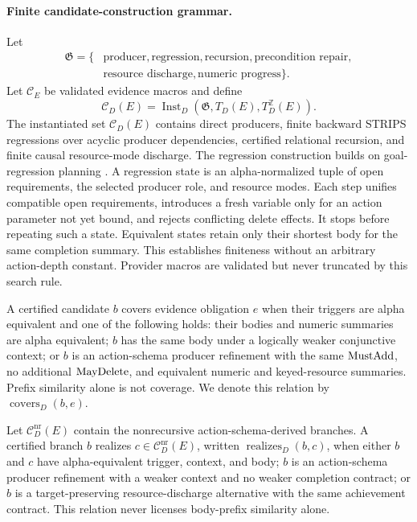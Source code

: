 \paragraph{Finite candidate-construction grammar.}
Let
\[
\begin{aligned}
\mathfrak G=\{&\text{producer},\text{regression},\text{recursion},
\text{precondition repair},\\
&\text{resource discharge},\text{numeric progress}\}.
\end{aligned}
\]
Let $\mathcal C_E$ be validated evidence macros and define
\[
\mathcal C_D(E)=
\operatorname{Inst}_D(\mathfrak G,T_D(E),T_D^{\mathbb Z}(E)).
\]
The instantiated set $\mathcal C_D(E)$ contains
direct producers, finite backward STRIPS regressions over acyclic
producer dependencies, certified relational recursion, and finite
causal resource-mode discharge. The regression construction builds on
goal-regression planning \cite{Fikes1972GeneralizedRobotPlans,Chen2026Moose}.
A regression state is an alpha-normalized tuple
of open requirements, the selected producer role, and resource modes. Each step
unifies compatible open requirements, introduces a fresh variable only for an
action parameter not yet bound, and rejects conflicting delete effects. It
stops before repeating such a state. Equivalent states retain only their
shortest body for the same completion summary. This establishes finiteness
without an arbitrary action-depth constant. Provider macros are validated but
never truncated by this search rule.

\begin{definition}
A certified candidate $b$ covers evidence obligation $e$ when their triggers are
alpha equivalent and one of the following holds: their bodies and numeric
summaries are alpha equivalent; $b$ has the same body under a logically weaker
conjunctive context; or $b$ is an action-schema producer refinement with the same
$\mathrm{MustAdd}$, no additional $\mathrm{MayDelete}$, and equivalent numeric and keyed-resource
summaries. Prefix similarity alone is not coverage.
We denote this relation by $\operatorname{covers}_D(b,e)$.
\end{definition}

\begin{definition}
Let $\mathcal C_D^{\mathrm{nr}}(E)$ contain the nonrecursive
action-schema-derived branches. A certified branch $b$ realizes
$c\in\mathcal C_D^{\mathrm{nr}}(E)$, written $\operatorname{realizes}_D(b,c)$, when
either $b$ and $c$ have alpha-equivalent trigger, context, and body; $b$ is an
action-schema producer refinement with a weaker context and no weaker
completion contract; or $b$ is a target-preserving resource-discharge
alternative with the same achievement contract. This relation never licenses
body-prefix similarity alone.
\end{definition}

